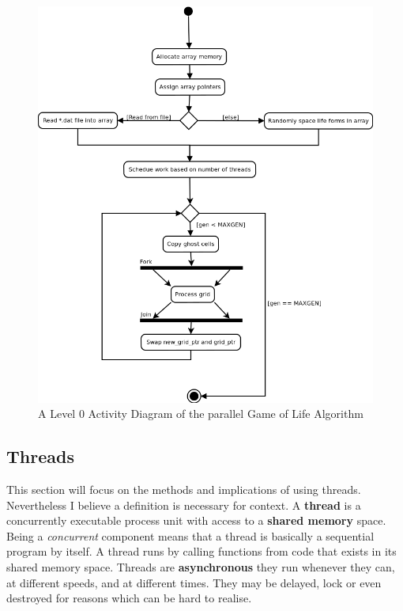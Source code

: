 \documentclass[11pt]{article} %
\begin{document}
\begin{figure}[h]
\caption{A Level 0 Activity Diagram of the parallel Game of Life Algorithm}
\centering
\includegraphics[scale=0.45]{parallel0.png}
\end{figure}
\subsection{Threads}
This section will focus on the methods and implications of using threads. Nevertheless I believe a definition is necessary for context. A {\bf thread} is a concurrently executable process unit with access to a {\bf shared memory} space. Being a {\it concurrent} component means that a thread is basically a sequential program by itself. A thread runs by calling functions from code that exists in its shared memory space. Threads are {\bf asynchronous} they run whenever they can, at different speeds, and at different times. They may be delayed, lock or even destroyed for reasons which can be hard to realise. \cite[p70]{ref13} 
\end{document}
